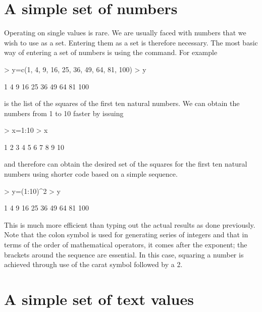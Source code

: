  
\section{A simple set of numbers} 
 
Operating on single values is rare. We are usually faced with numbers that we wish to use as a set. Entering them as a set is therefore necessary. The most basic way of entering a set of numbers is using the  command. For example 
\begin{Schunk}
\begin{Sinput}
> y=c(1, 4, 9, 16, 25, 36, 49, 64, 81, 100) 
> y 
\end{Sinput}
\begin{Soutput}
 [1]   1   4   9  16  25  36  49  64  81 100
\end{Soutput}
\end{Schunk}
is the list of the squares of the first ten natural numbers. We can obtain the numbers from 1 to 10 faster by issuing 
\begin{Schunk}
\begin{Sinput}
> x=1:10 
> x 
\end{Sinput}
\begin{Soutput}
 [1]  1  2  3  4  5  6  7  8  9 10
\end{Soutput}
\end{Schunk}
and therefore can obtain the desired set of the squares for the first ten natural numbers using shorter code based on a simple sequence. 
\begin{Schunk}
\begin{Sinput}
> y=(1:10)^2 
> y 
\end{Sinput}
\begin{Soutput}
 [1]   1   4   9  16  25  36  49  64  81 100
\end{Soutput}
\end{Schunk}
This is much more efficient than typing out the actual results as done previously. Note that the colon symbol is used for generating series of integers and that in terms of the order of mathematical operators, it comes after the exponent; the brackets around the sequence are essential. In this case, squaring a number is achieved through use of the carat symbol followed by a 2.  
 
 
\section{A simple set of text values} 
 
